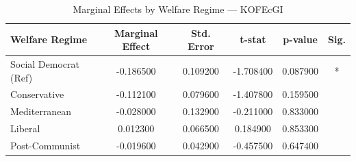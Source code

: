 \begin{table}[htbp]
\caption{Marginal Effects by Welfare Regime — KOFEcGI}
\label{tab:marginal_effects_KOFEcGI}
\begin{tabular}{lccccc}
\toprule
Welfare Regime & Marginal Effect & Std. Error & t-stat & p-value & Sig. \\
\midrule
Social Democrat (Ref) & -0.186500 & 0.109200 & -1.708400 & 0.087900 & * \\
Conservative & -0.112100 & 0.079600 & -1.407800 & 0.159500 &  \\
Mediterranean & -0.028000 & 0.132900 & -0.211000 & 0.833000 &  \\
Liberal & 0.012300 & 0.066500 & 0.184900 & 0.853300 &  \\
Post-Communist & -0.019600 & 0.042900 & -0.457500 & 0.647400 &  \\
\bottomrule
\end{tabular}
\end{table}
